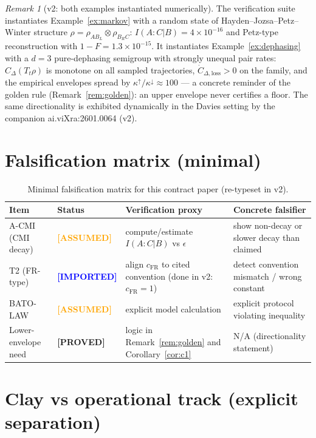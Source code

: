 \documentclass[11pt]{article}
\theoremstyle{definition}
\theoremstyle{remark}
\newtheorem{remark}[theorem]{Remark}
\newcommand{\ASSUMED}{\textcolor{orange}{\textbf{[ASSUMED]}}}
\newcommand{\PROVED}{\textcolor{green!60!black}{\textbf{[PROVED]}}}
\newcommand{\IMPORTED}{\textcolor{blue}{\textbf{[IMPORTED]}}}
\begin{document}
\begin{remark}[v2: both examples instantiated numerically]
\label{rem:examples}
The verification suite instantiates Example~\ref{ex:markov} with a
random state of Hayden--Jozsa--Petz--Winter structure $\rho = \rho_{A
B_L} \otimes \rho_{B_R C}$: $I(A : C | B) = 4\times10^{-16}$ and
Petz-type reconstruction with $1 - F = 1.3\times10^{-15}$. It
instantiates Example~\ref{ex:dephasing} with a $d = 3$ pure-dephasing
semigroup with strongly unequal pair rates: $C_\Delta(T_t\rho)$ is
monotone on all sampled trajectories, $\dot{C}_{\Delta,\mathrm{loss}} >
0$ on the family, and the empirical envelopes spread by
$\kappa^{\uparrow}/\kappa^{\downarrow} \approx 100$ --- a concrete
reminder of the golden rule (Remark~\ref{rem:golden}): an upper envelope
never certifies a floor. The same directionality is exhibited
dynamically in the Davies setting by the companion ai.viXra:2601.0064
(v2).
\end{remark}

\section{Falsification matrix (minimal)}

\begin{table}[h!]
\centering
\begin{tabular}{p{3.2cm} p{2.4cm} p{4.0cm} p{4.2cm}}
\hline
\textbf{Item} & \textbf{Status} & \textbf{Verification proxy} &
\textbf{Concrete falsifier} \\
\hline
A-CMI (CMI decay) & \ASSUMED & compute/estimate $I(A:C|B)$ vs $\epsilon$
& show non-decay or slower decay than claimed \\
T2 (FR-type) & \IMPORTED & align $c_{\mathrm{FR}}$ to cited convention
(done in v2: $c_{\mathrm{FR}} = 1$) & detect convention mismatch / wrong
constant \\
BATO-LAW & \ASSUMED & explicit model calculation & explicit protocol
violating inequality \\
Lower-envelope need & \PROVED & logic in Remark~\ref{rem:golden} and
Corollary~\ref{cor:c1} & N/A (directionality statement) \\
\hline
\end{tabular}
\caption{Minimal falsification matrix for this contract paper
(re-typeset in v2).}
\label{tab:fals}
\end{table}

\section{Clay vs operational track (explicit separation)}
\end{document}
